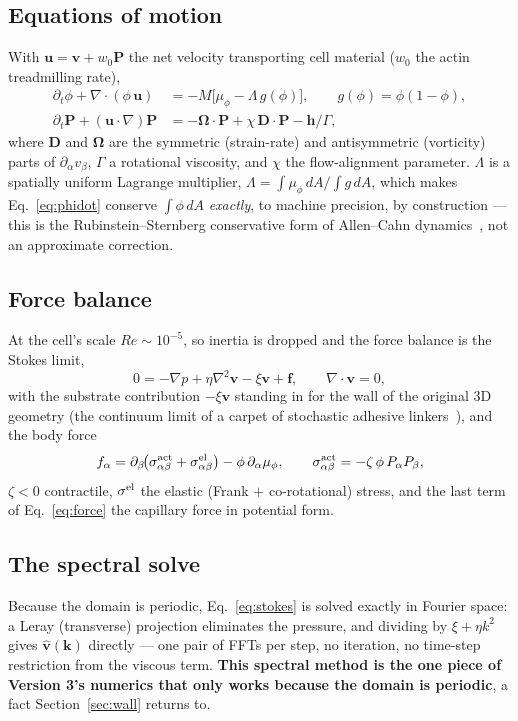 \documentclass[11pt]{article}
\newcommand{\bP}{\mathbf{P}}
\newcommand{\bv}{\mathbf{v}}
\newcommand{\bu}{\mathbf{u}}
\newcommand{\bh}{\mathbf{h}}
\begin{document}
\subsection{Equations of motion}
With $\bu=\bv+w_0\bP$ the net velocity transporting cell material
($w_0$ the actin treadmilling rate),
\begin{align}
\partial_t\phi + \nabla\!\cdot\!(\phi\,\bu) &= -M\big[\mu_\phi-\Lambda\,g(\phi)\big],
\qquad g(\phi)=\phi(1-\phi),
\label{eq:phidot}\\
\partial_t\bP + (\bu\cdot\nabla)\bP &= -\boldsymbol\Omega\cdot\bP + \chi\,\mathbf D\cdot\bP - \bh/\Gamma,
\label{eq:Pdot}
\end{align}
where $\mathbf D$ and $\boldsymbol\Omega$ are the symmetric
(strain-rate) and antisymmetric (vorticity) parts of
$\partial_\alpha v_\beta$, $\Gamma$ a rotational viscosity, and
$\chi$ the flow-alignment parameter. $\Lambda$ is a spatially uniform
Lagrange multiplier, $\Lambda=\int\mu_\phi\,dA/\int g\,dA$, which makes
Eq.~\eqref{eq:phidot} conserve $\int\phi\,dA$ \emph{exactly}, to
machine precision, by construction — this is the
Rubinstein--Sternberg conservative form of Allen--Cahn
dynamics~\cite{Rubinstein1992}, not an approximate correction.

\subsection{Force balance}
At the cell's scale $Re\sim10^{-5}$, so inertia is dropped and the
force balance is the Stokes limit,
\begin{equation}
0 = -\nabla p + \eta\nabla^2\bv - \xi\bv + \mathbf f,
\qquad \nabla\!\cdot\!\bv = 0,
\label{eq:stokes}
\end{equation}
with the substrate contribution $-\xi\bv$ standing in for the wall of
the original 3D geometry (the continuum limit of a carpet of
stochastic adhesive linkers~\cite{LeoniSens2017}), and the body force
\begin{equation}
f_\alpha = \partial_\beta\!\big(\sigma^{\rm act}_{\alpha\beta}+\sigma^{\rm el}_{\alpha\beta}\big) - \phi\,\partial_\alpha\mu_\phi,
\qquad
\sigma^{\rm act}_{\alpha\beta} = -\zeta\,\phi\,P_\alpha P_\beta,
\label{eq:force}
\end{equation}
$\zeta<0$ contractile, $\sigma^{\rm el}$ the elastic (Frank $+$
co-rotational) stress, and the last term of Eq.~\eqref{eq:force} the
capillary force in potential form.

\subsection{The spectral solve}
Because the domain is periodic, Eq.~\eqref{eq:stokes} is solved
exactly in Fourier space: a Leray (transverse) projection eliminates
the pressure, and dividing by $\xi+\eta k^2$ gives $\hat{\bv}(\mathbf
k)$ directly — one pair of FFTs per step, no iteration, no time-step
restriction from the viscous term. \textbf{This spectral method is
the one piece of Version 3's numerics that only works because the
domain is periodic}, a fact Section~\ref{sec:wall} returns to.
\end{document}
